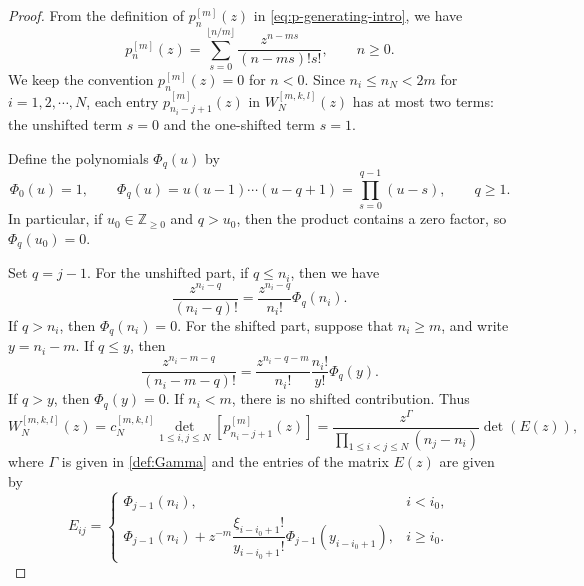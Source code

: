 \documentclass[preprint,3p,10pt]{elsarticle}
\theoremstyle{definition}
\begin{document}
\begin{proof}
From the definition of $p_n^{[m]}(z)$ in \eqref{eq:p-generating-intro}, we have
\begin{equation}\label{eq:p-expansion}
    p_n^{[m]}(z)
    =
    \sum_{s=0}^{\lfloor n/m\rfloor}
    \frac{z^{n-ms}}{(n-ms)!s!},
    \qquad n\ge0.
\end{equation}
We keep the convention \(p_n^{[m]}(z)=0\) for \(n<0\).
Since \(n_i\le n_N<2m\) for \(i=1,2,\cdots,N\), each entry
\(p_{n_i-j+1}^{[m]}(z)\) in $W_N^{[m,k,l]}(z)$ has at most two terms:
the unshifted term \(s=0\) and the one-shifted term
\(s=1\). 

Define the polynomials $\Phi_q(u)$ by
\begin{equation}
    \Phi_0(u)=1,
    \qquad
    \Phi_q(u)=u(u-1)\cdots(u-q+1)
    =
    \prod_{s=0}^{q-1}(u-s),
    \qquad q\ge1.
\end{equation}
In particular, if
\(u_0\in\mathbb{Z}_{\ge0}\) and \(q>u_0\), then the product contains a zero factor, so \(\Phi_q(u_0)=0\).

Set $q=j-1$. For the unshifted part,  if \(q\le n_i\), then we have
\begin{equation}
    \frac{z^{n_i-q}}{(n_i-q)!}
    =
    \frac{z^{n_i-q}}{n_i!} \Phi_q(n_i).
\end{equation}
If \(q>n_i\), then
\(\Phi_q(n_i)=0\).
For the shifted part, suppose that \(n_i\ge m\), and write
\(y=n_i-m\). If \(q\le y\), then
\begin{equation}
    \frac{z^{n_i-m-q}}{(n_i-m-q)!}
    =
    \frac{z^{n_i-q-m}}{n_i!} 
    \frac{n_i!}{y!}\Phi_q(y).
\end{equation}
If \(q>y\), then \(\Phi_q(y)=0\). If
\(n_i<m\), there is no shifted contribution.
Thus
\begin{equation}
    W_N^{[m,k,l]}(z)=c_N^{[m,k,l]}\det_{1\le i,j\le N}\left[p_{n_i-j+1}^{[m]}(z)\right]
    =
    \frac{z^\Gamma}{\prod_{1\le i<j\le N}(n_j-n_i)}\det\left( E(z)\right),
    \label{eq:det-factorized-large-m}
\end{equation}
where $\Gamma$ is given in \eqref{def:Gamma} and 
the entries of the matrix \(E(z)\) are given by
\begin{equation}
    E_{ij} = 
\begin{cases} 
\Phi_{j-1}(n_i), & i < i_0, \\ 
\Phi_{j-1}(n_i) + z^{-m}\dfrac{\xi_{i-i_0+1}!}{y_{i-i_0+1}!} \Phi_{j-1}(y_{i-i_0+1}), & i \ge i_0.
\end{cases}
\end{equation}




\end{proof}
\end{document}
